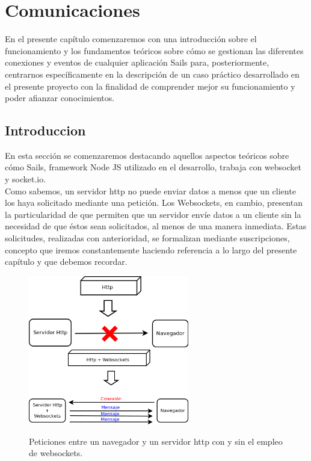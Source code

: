 

\newpage

\chapter{Comunicaciones}
\label{chap:comunicaciones}

En el presente capítulo comenzaremos con una introducción sobre el funcionamiento y los fundamentos teóricos sobre cómo se gestionan las diferentes conexiones y eventos de cualquier aplicación
Sails para, posteriormente, centrarnos específicamente en la descripción de un caso práctico desarrollado en el presente proyecto con la finalidad de comprender mejor su funcionamiento y poder afianzar
conocimientos.


\section{Introduccion}
\label{sec:fundamentos}

En esta sección se comenzaremos destacando aquellos aspectos teóricos sobre cómo Sails, framework Node JS utilizado en el desarrollo, trabaja con websocket y socket.io.\\

Como sabemos, un servidor http no puede enviar datos a menos que un cliente los haya solicitado mediante una petición. Los Websockets, en cambio, presentan la particularidad de que
permiten que un servidor envíe datos a un cliente sin la necesidad de que éstos sean solicitados, al menos de una manera inmediata. Estas solicitudes, realizadas con anterioridad, se formalizan mediante suscripciones, concepto que 
iremos constantemente haciendo referencia a lo largo del presente capítulo y que debemos recordar.\\


\begin{figure}%
    \centering
    \includegraphics[width=7cm]{diagramas/http-weboscket.png}
    \qquad
    \includegraphics[width=7cm]{diagramas/http+weboscket.png}
    \caption{Peticiones entre un navegador y un servidor http con y sin el empleo de websockets.}%
    \label{fig:http-request}%
\end{figure}

